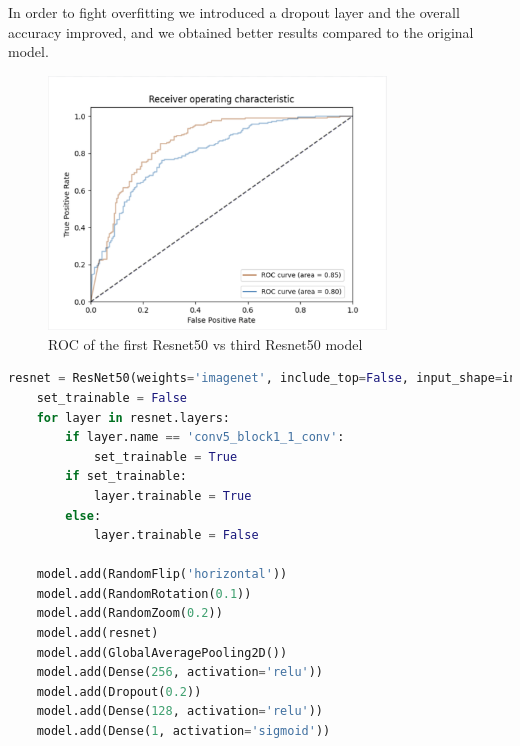 In order to fight overfitting we introduced a dropout layer and the overall accuracy improved, and we obtained better results compared to the original model. 
\begin{figure}[h!]
    \centering
    \includegraphics[width=0.8\textwidth]{images/ROCResnet.png}
    \caption{ROC of the first Resnet50 vs third Resnet50 model}
    \label{fig:ROCResnet}
\end{figure}

\begin{lstlisting}[language=python, caption={ResNet50 Third test}, label={lst:resnet50CodeThirdTest}]
    resnet = ResNet50(weights='imagenet', include_top=False, input_shape=input_shape)
    set_trainable = False
    for layer in resnet.layers:
        if layer.name == 'conv5_block1_1_conv':
            set_trainable = True
        if set_trainable:
            layer.trainable = True
        else:
            layer.trainable = False

    model.add(RandomFlip('horizontal'))
    model.add(RandomRotation(0.1))
    model.add(RandomZoom(0.2))
    model.add(resnet)
    model.add(GlobalAveragePooling2D())
    model.add(Dense(256, activation='relu'))
    model.add(Dropout(0.2))
    model.add(Dense(128, activation='relu'))
    model.add(Dense(1, activation='sigmoid'))
\end{lstlisting}


